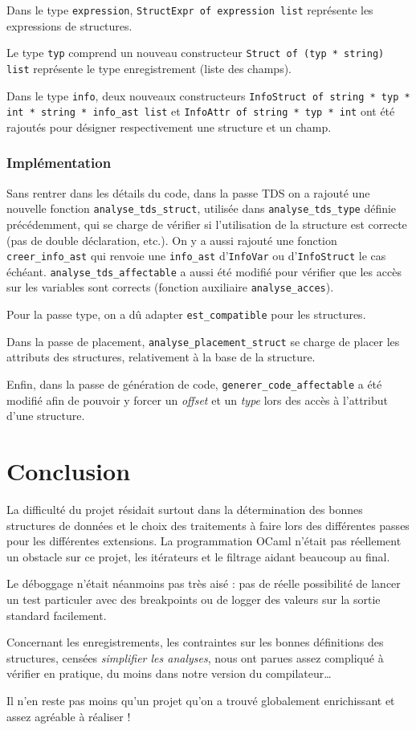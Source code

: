 \documentclass[headings=standardclasses,parskip=half]{scrartcl}
\begin{document}
Dans le type \texttt{expression}, \texttt{StructExpr of expression list}
représente les expressions de structures.

Le type \texttt{typ} comprend un nouveau constructeur
\texttt{Struct of (typ * string) list} représente le type enregistrement
(liste des champs).

Dans le type \texttt{info}, deux nouveaux constructeurs
\texttt{InfoStruct of string * typ * int * string * info\_ast list} et
\texttt{InfoAttr of string * typ * int}
ont été rajoutés pour désigner respectivement une structure et un champ.

\subsubsection*{Implémentation}

Sans rentrer dans les détails du code, dans la passe TDS on a rajouté
une nouvelle fonction \texttt{analyse\_tds\_struct}, utilisée dans
\texttt{analyse\_tds\_type} définie précédemment, qui se charge de
vérifier si l'utilisation de la structure est correcte (pas de double
déclaration, etc.). On y a aussi rajouté une fonction
\texttt{creer\_info\_ast} qui renvoie une \texttt{info\_ast}
d'\texttt{InfoVar} ou d'\texttt{InfoStruct} le cas échéant.
\texttt{analyse\_tds\_affectable} a aussi été modifié pour vérifier
que les accès sur les variables sont corrects (fonction auxiliaire
\texttt{analyse\_acces}).

Pour la passe type, on a dû adapter \texttt{est\_compatible}
pour les structures.

Dans la passe de placement, \texttt{analyse\_placement\_struct} se
charge de placer les attributs des structures, relativement à la base
de la structure.

Enfin, dans la passe de génération de code,
\texttt{generer\_code\_affectable} a été modifié afin de pouvoir
y forcer un \textit{offset} et un \textit{type} lors des accès
à l'attribut d'une structure.

\section{Conclusion}

La difficulté du projet résidait surtout dans la détermination des
bonnes structures de données et le choix des traitements à faire
lors des différentes passes pour les différentes extensions.
La programmation OCaml n'était pas réellement un obstacle
sur ce projet, les itérateurs et le filtrage aidant beaucoup au
final.

Le déboggage n'était néanmoins pas très aisé : pas de réelle possibilité
de lancer un test particuler avec des breakpoints ou de logger des
valeurs sur la sortie standard facilement.

Concernant les enregistrements, les contraintes sur les bonnes
définitions des structures, censées \textit{simplifier les analyses},
nous ont parues assez compliqué à vérifier en pratique, du moins dans
notre version du compilateur\dots

Il n'en reste pas moins qu'un projet qu'on a trouvé globalement
enrichissant et assez agréable à réaliser !
\end{document}
